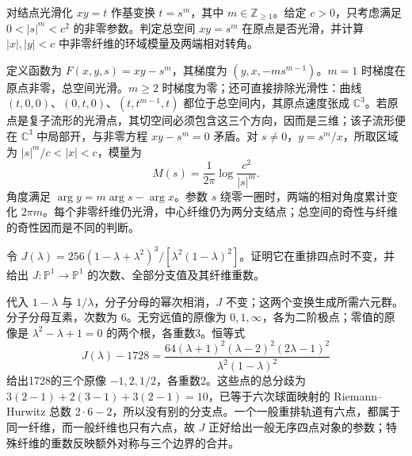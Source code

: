 \begin{exercise}
	对结点光滑化 \(xy=t\) 作基变换 \(t=s^m\)，其中 \(m\in\mathbb Z_{\ge1}\)。给定 \(c>0\)，只考虑满足 \(0<|s|^m<c^2\) 的非零参数。判定总空间 \(xy=s^m\) 在原点是否光滑，并计算 \(|x|,|y|<c\) 中非零纤维的环域模量及两端相对转角。
\end{exercise}
\begin{solution}
	定义函数为 \(F(x,y,s)=xy-s^m\)，其梯度为 \((y,x,-ms^{m-1})\)。\(m=1\) 时梯度在原点非零，总空间光滑。\(m\ge2\) 时梯度为零；还可直接排除光滑性：曲线 \((t,0,0)\)、\((0,t,0)\)、\((t,t^{m-1},t)\) 都位于总空间内，其原点速度张成 \(\mathbb C^3\)。若原点是复子流形的光滑点，其切空间必须包含这三个方向，因而是三维；该子流形便在 \(\mathbb C^3\) 中局部开，与非零方程 \(xy-s^m=0\) 矛盾。对 \(s\ne0\)，\(y=s^m/x\)，所取区域为 \(|s|^m/c<|x|<c\)，模量为
	\[
		M(s)=\frac1{2\pi}\log\frac{c^2}{|s|^m}.
	\]
	角度满足 \(\arg y=m\arg s-\arg x\)。参数 \(s\) 绕零一圈时，两端的相对角度累计变化 \(2\pi m\)。每个非零纤维仍光滑，中心纤维仍为两分支结点；总空间的奇性与纤维的奇性因而是不同的判断。
\end{solution}

\begin{exercise}
	令 \(J(\lambda)=256(1-\lambda+\lambda^2)^3/[\lambda^2(1-\lambda)^2]\)。证明它在重排四点时不变，并给出 \(J:\mathbb P^1\to\mathbb P^1\) 的次数、全部分支值及其纤维重数。
\end{exercise}
\begin{solution}
	代入 \(1-\lambda\) 与 \(1/\lambda\)，分子分母的幂次相消，\(J\) 不变；这两个变换生成所需六元群。分子分母互素，次数为 \(6\)。无穷远值的原像为 \(0,1,\infty\)，各为二阶极点；零值的原像是 \(\lambda^2-\lambda+1=0\) 的两个根，各重数3。恒等式
	\[
		J(\lambda)-1728=\frac{64(\lambda+1)^2(\lambda-2)^2(2\lambda-1)^2}{\lambda^2(1-\lambda)^2}
	\]
	给出1728的三个原像 \(-1,2,1/2\)，各重数2。这些点的总分歧为 \(3(2-1)+2(3-1)+3(2-1)=10\)，已等于六次球面映射的 Riemann--Hurwitz 总数 \(2\cdot6-2\)，所以没有别的分支点。一个一般重排轨道有六点，都属于同一纤维，而一般纤维也只有六点，故 \(J\) 正好给出一般无序四点对象的参数；特殊纤维的重数反映额外对称与三个边界的合并。
\end{solution}


